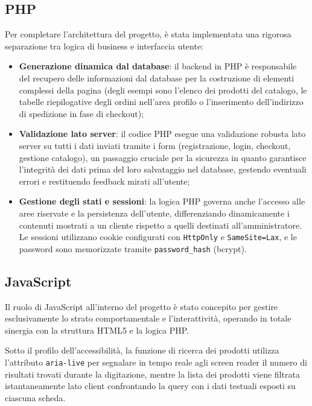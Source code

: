 \documentclass[11pt,a4paper]{article}
\begin{document}
\subsection{PHP}
Per completare l'architettura del progetto, \`e stata implementata una rigorosa separazione tra logica di business e interfaccia utente:

\begin{itemize}
  \item \textbf{Generazione dinamica dal database}: il backend in PHP \`e responsabile del recupero delle informazioni dal database per la costruzione di elementi complessi della pagina (degli esempi sono l'elenco dei prodotti del catalogo, le tabelle riepilogative degli ordini nell'area profilo o l'inserimento dell'indirizzo di spedizione in fase di checkout);
  \item \textbf{Validazione lato server}: il codice PHP esegue una validazione robusta lato server su tutti i dati inviati tramite i form (registrazione, login, checkout, gestione catalogo), un passaggio cruciale per la sicurezza in quanto garantisce l'integrit\`a dei dati prima del loro salvataggio nel database, gestendo eventuali errori e restituendo feedback mirati all'utente;
  \item \textbf{Gestione degli stati e sessioni}: la logica PHP governa anche l'accesso alle aree riservate e la persistenza dell'utente, differenziando dinamicamente i contenuti mostrati a un cliente rispetto a quelli destinati all'amministratore. Le sessioni utilizzano cookie configurati con \texttt{HttpOnly} e \texttt{SameSite=Lax}, e le password sono memorizzate tramite \texttt{password\_hash} (bcrypt).
\end{itemize}

\subsection{JavaScript}
Il ruolo di JavaScript all'interno del progetto \`e stato concepito per gestire esclusivamente lo strato comportamentale e l'interattivit\`a, operando in totale sinergia con la struttura HTML5 e la logica PHP.

Sotto il profilo dell'accessibilit\`a, la funzione di ricerca dei prodotti utilizza l'attributo \texttt{aria-live} per segnalare in tempo reale agli screen reader il numero di risultati trovati durante la digitazione, mentre la lista dei prodotti viene filtrata istantaneamente lato client confrontando la query con i dati testuali esposti su ciascuna scheda.
\end{document}
